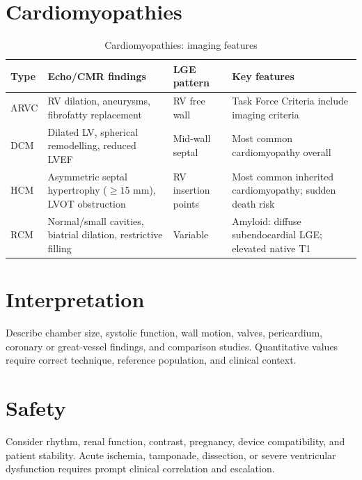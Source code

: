 \section{Cardiomyopathies}
\begin{table}[h]
\centering
\caption{Cardiomyopathies: imaging features}
\begin{tabular}{p{3cm} p{3.5cm} p{3.5cm} p{3cm}}
\hline
\textbf{Type} & \textbf{Echo/CMR findings} & \textbf{LGE pattern} & \textbf{Key features} \\
\hline
ARVC & RV dilation, aneurysms, fibrofatty replacement & RV free wall & Task Force Criteria include imaging criteria \\
DCM & Dilated LV, spherical remodelling, reduced LVEF & Mid-wall septal & Most common cardiomyopathy overall \\
HCM & Asymmetric septal hypertrophy ($\geq 15$ mm), LVOT obstruction & RV insertion points & Most common inherited cardiomyopathy; sudden death risk \\
RCM & Normal/small cavities, biatrial dilation, restrictive filling & Variable & Amyloid: diffuse subendocardial LGE; elevated native T1 \\
\hline
\end{tabular}
\end{table}


\section{Interpretation}
Describe chamber size, systolic function, wall motion, valves, pericardium, coronary or great-vessel findings, and comparison studies. Quantitative values require correct technique, reference population, and clinical context.

\section{Safety}
Consider rhythm, renal function, contrast, pregnancy, device compatibility, and patient stability. Acute ischemia, tamponade, dissection, or severe ventricular dysfunction requires prompt clinical correlation and escalation.

\clearpage
